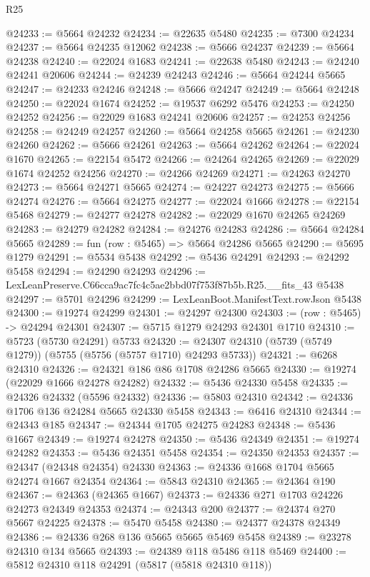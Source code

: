 \begin{lexlean}{R25}
\begin{coremodule}
@24233 := @5664 @24232
@24234 := @22635 @5480
@24235 := @7300 @24234
@24237 := @5664 @24235 @12062
@24238 := @5666 @24237
@24239 := @5664 @24238
@24240 := @22024 @1683
@24241 := @22638 @5480
@24243 := @24240 @24241 @20606
@24244 := @24239 @24243
@24246 := @5664 @24244 @5665
@24247 := @24233 @24246
@24248 := @5666 @24247
@24249 := @5664 @24248
@24250 := @22024 @1674
@24252 := @19537 @6292 @5476
@24253 := @24250 @24252
@24256 := @22029 @1683 @24241 @20606
@24257 := @24253 @24256
@24258 := @24249 @24257
@24260 := @5664 @24258 @5665
@24261 := @24230 @24260
@24262 := @5666 @24261
@24263 := @5664 @24262
@24264 := @22024 @1670
@24265 := @22154 @5472
@24266 := @24264 @24265
@24269 := @22029 @1674 @24252 @24256
@24270 := @24266 @24269
@24271 := @24263 @24270
@24273 := @5664 @24271 @5665
@24274 := @24227 @24273
@24275 := @5666 @24274
@24276 := @5664 @24275
@24277 := @22024 @1666
@24278 := @22154 @5468
@24279 := @24277 @24278
@24282 := @22029 @1670 @24265 @24269
@24283 := @24279 @24282
@24284 := @24276 @24283
@24286 := @5664 @24284 @5665
@24289 := fun (row : @5465) => @5664 @24286 @5665
@24290 := @5695 @1279
@24291 := @5534 @5438
@24292 := @5436 @24291
@24293 := @24292 @5458
@24294 := @24290 @24293
@24296 := LexLeanPreserve.C66cca9ac7fc4c5ae2bbd07f753f87b5b.R25.__fits_43 @5438
@24297 := @5701 @24296
@24299 := LexLeanBoot.ManifestText.rowJson @5438
@24300 := @19274 @24299
@24301 := @24297 @24300
@24303 := (row : @5465) -> @24294 @24301
@24307 := @5715 @1279 @24293 @24301 @1710
@24310 := @5723 (@5730 @24291) @5733
@24320 := @24307 @24310 (@5739 (@5749 @1279)) (@5755 (@5756 (@5757 @1710) @24293 @5733))
@24321 := @6268 @24310
@24326 := @24321 @186 @86 @1708 @24286 @5665
@24330 := @19274 (@22029 @1666 @24278 @24282)
@24332 := @5436 @24330 @5458
@24335 := @24326 @24332 (@5596 @24332)
@24336 := @5803 @24310
@24342 := @24336 @1706 @136 @24284 @5665 @24330 @5458
@24343 := @6416 @24310
@24344 := @24343 @185
@24347 := @24344 @1705 @24275 @24283
@24348 := @5436 @1667
@24349 := @19274 @24278
@24350 := @5436 @24349
@24351 := @19274 @24282
@24353 := @5436 @24351 @5458
@24354 := @24350 @24353
@24357 := @24347 (@24348 @24354) @24330
@24363 := @24336 @1668 @1704 @5665 @24274 @1667 @24354
@24364 := @5843 @24310
@24365 := @24364 @190
@24367 := @24363 (@24365 @1667)
@24373 := @24336 @271 @1703 @24226 @24273 @24349 @24353
@24374 := @24343 @200
@24377 := @24374 @270 @5667 @24225
@24378 := @5470 @5458
@24380 := @24377 @24378 @24349
@24386 := @24336 @268 @136 @5665 @5665 @5469 @5458
@24389 := @23278 @24310 @134 @5665
@24393 := @24389 @118 @5486 @118 @5469
@24400 := @5812 @24310 @118 @24291 (@5817 (@5818 @24310 @118))

\end{coremodule}
\end{lexlean}
